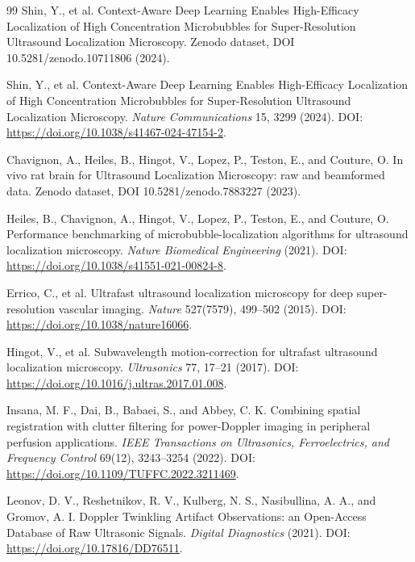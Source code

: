 \documentclass[11pt]{article}
\begin{document}
\begin{thebibliography}{99}
Shin, Y., et al.
\newblock Context-Aware Deep Learning Enables High-Efficacy Localization of High Concentration Microbubbles for Super-Resolution Ultrasound Localization Microscopy.
\newblock Zenodo dataset, DOI 10.5281/zenodo.10711806 (2024).

Shin, Y., et al.
\newblock Context-Aware Deep Learning Enables High-Efficacy Localization of High Concentration Microbubbles for Super-Resolution Ultrasound Localization Microscopy.
\newblock \emph{Nature Communications} 15, 3299 (2024).
\newblock DOI: \url{https://doi.org/10.1038/s41467-024-47154-2}.

Chavignon, A., Heiles, B., Hingot, V., Lopez, P., Teston, E., and Couture, O.
\newblock In vivo rat brain for Ultrasound Localization Microscopy: raw and beamformed data.
\newblock Zenodo dataset, DOI 10.5281/zenodo.7883227 (2023).

Heiles, B., Chavignon, A., Hingot, V., Lopez, P., Teston, E., and Couture, O.
\newblock Performance benchmarking of microbubble-localization algorithms for ultrasound localization microscopy.
\newblock \emph{Nature Biomedical Engineering} (2021).
\newblock DOI: \url{https://doi.org/10.1038/s41551-021-00824-8}.

Errico, C., et al.
\newblock Ultrafast ultrasound localization microscopy for deep super-resolution vascular imaging.
\newblock \emph{Nature} 527(7579), 499--502 (2015).
\newblock DOI: \url{https://doi.org/10.1038/nature16066}.

Hingot, V., et al.
\newblock Subwavelength motion-correction for ultrafast ultrasound localization microscopy.
\newblock \emph{Ultrasonics} 77, 17--21 (2017).
\newblock DOI: \url{https://doi.org/10.1016/j.ultras.2017.01.008}.

Insana, M. F., Dai, B., Babaei, S., and Abbey, C. K.
\newblock Combining spatial registration with clutter filtering for power-Doppler imaging in peripheral perfusion applications.
\newblock \emph{IEEE Transactions on Ultrasonics, Ferroelectrics, and Frequency Control} 69(12), 3243--3254 (2022).
\newblock DOI: \url{https://doi.org/10.1109/TUFFC.2022.3211469}.

Leonov, D. V., Reshetnikov, R. V., Kulberg, N. S., Nasibullina, A. A., and Gromov, A. I.
\newblock Doppler Twinkling Artifact Observations: an Open-Access Database of Raw Ultrasonic Signals.
\newblock \emph{Digital Diagnostics} (2021).
\newblock DOI: \url{https://doi.org/10.17816/DD76511}.


\end{thebibliography}
\end{document}
